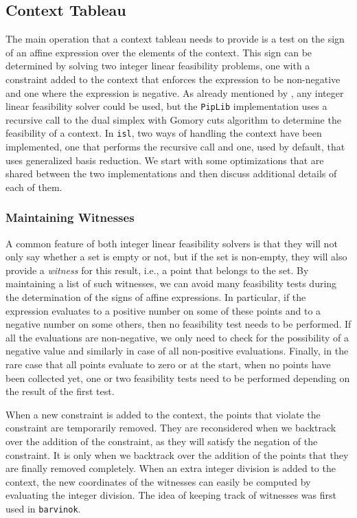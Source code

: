 \subsection{Context Tableau}\label{s:context}

The main operation that a context tableau needs to provide is a test
on the sign of an affine expression over the elements of the context.
This sign can be determined by solving two integer linear feasibility
problems, one with a constraint added to the context that enforces
the expression to be non-negative and one where the expression is
negative.  As already mentioned by \textcite{Feautrier88parametric},
any integer linear feasibility solver could be used, but the {\tt PipLib}
implementation uses a recursive call to the dual simplex with Gomory
cuts algorithm to determine the feasibility of a context.
In {\tt isl}, two ways of handling the context have been implemented,
one that performs the recursive call and one, used by default, that
uses generalized basis reduction.
We start with some optimizations that are shared between the two
implementations and then discuss additional details of each of them.

\subsubsection{Maintaining Witnesses}\label{s:witness}

A common feature of both integer linear feasibility solvers is that
they will not only say whether a set is empty or not, but if the set
is non-empty, they will also provide a \emph{witness} for this result,
i.e., a point that belongs to the set.  By maintaining a list of such
witnesses, we can avoid many feasibility tests during the determination
of the signs of affine expressions.  In particular, if the expression
evaluates to a positive number on some of these points and to a negative
number on some others, then no feasibility test needs to be performed.
If all the evaluations are non-negative, we only need to check for the
possibility of a negative value and similarly in case of all
non-positive evaluations.  Finally, in the rare case that all points
evaluate to zero or at the start, when no points have been collected yet,
one or two feasibility tests need to be performed depending on the result
of the first test.

When a new constraint is added to the context, the points that
violate the constraint are temporarily removed.  They are reconsidered
when we backtrack over the addition of the constraint, as they will
satisfy the negation of the constraint.  It is only when we backtrack
over the addition of the points that they are finally removed completely.
When an extra integer division is added to the context,
the new coordinates of the
witnesses can easily be computed by evaluating the integer division.
The idea of keeping track of witnesses was first used in {\tt barvinok}.

